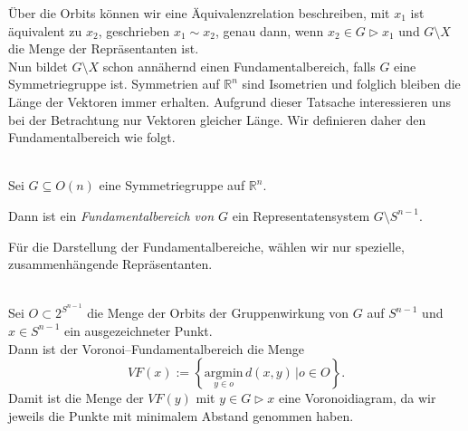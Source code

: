 Über die Orbits können wir eine Äquivalenzrelation beschreiben, mit $x_1$ ist äquivalent zu $x_2$, geschrieben $x_1 \sim x_2$, genau dann, wenn $x_2 \in G \rhd x_1$ und $G \setminus X$ die Menge der Repräsentanten ist.\\

Nun bildet $G \setminus X$ schon annähernd einen Fundamentalbereich, falls $G$ eine Symmetriegruppe ist. Symmetrien auf $\mathbb{R}^n$ sind Isometrien und folglich bleiben die Länge der Vektoren immer erhalten. Aufgrund dieser Tatsache interessieren uns bei der Betrachtung nur Vektoren gleicher Länge. Wir definieren daher den Fundamentalbereich wie folgt.\\

\begin{definition}[Fundamentalbereich]\label{fundamentalbereich:def} \mbox{}\\
   Sei $G \subseteq O(n)$ eine Symmetriegruppe auf $\mathbb{R}^n$.

   \noindent Dann ist ein \emph{Fundamentalbereich von $G$} ein Representatensystem $G \setminus S^{n-1}$.
\end{definition} 

Für die Darstellung der Fundamentalbereiche, wählen wir nur spezielle, zusammenhängende Repräsentanten.

\begin{definition}\label{fundamentalbereich:voronoi} \mbox{}\\
   Sei $O \subset 2^{S^{n-1}}$ die Menge der Orbits der Gruppenwirkung von $G$ auf $S^{n-1}$ und $x \in S^{n-1}$ ein ausgezeichneter Punkt.\\

   Dann ist der Voronoi--Fundamentalbereich die Menge
   $$
      VF(x) := \left\{ \underset{y\in o}{\text{argmin}} \, d(x,y) \, |  o \in O\right\}.
   $$
   Damit ist die Menge der $VF(y)$ mit $y \in G \rhd x$ eine Voronoidiagram, da wir jeweils die Punkte mit minimalem Abstand genommen haben.
\end{definition}


